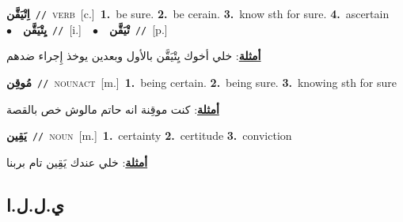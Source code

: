 \documentclass[10pt,a4paper,twoside]{article} %
\begin{document}
\begin{multicols}{2}
{{{{{{\setlength\topsep{0pt}\textbf{\foreignlanguage{arabic}{اِتْيَقَّن}}\ {\color{gray}\texttt{//}\color{black}}\ \textsc{verb}\ [c.]\ \textbf{1.}~be sure.  \textbf{2.}~be cerain.  \textbf{3.}~know sth for sure.  \textbf{4.}~ascertain\ \ $\bullet$\ \ \setlength\topsep{0pt}\textbf{\foreignlanguage{arabic}{يِتْيَقَّن}}\ {\color{gray}\texttt{//}\color{black}}\ [i.]\ \ $\bullet$\ \ \setlength\topsep{0pt}\textbf{\foreignlanguage{arabic}{تْيَقَّن}}\ {\color{gray}\texttt{//}\color{black}}\ [p.]\  \begin{flushright}\color{gray}\foreignlanguage{arabic}{\textbf{\underline{\foreignlanguage{arabic}{أمثلة}}}: خلي أخوك يِتْيَقَّن بالأول وبعدين يوخذ إِجراء ضدهم}\end{flushright}\color{black}} \vspace{2mm}

{\setlength\topsep{0pt}\textbf{\foreignlanguage{arabic}{مُوقِن}}\ {\color{gray}\texttt{//}\color{black}}\ \textsc{noun\textunderscore act}\ [m.]\ \textbf{1.}~being certain.  \textbf{2.}~being sure.  \textbf{3.}~knowing sth for sure\  \begin{flushright}\color{gray}\foreignlanguage{arabic}{\textbf{\underline{\foreignlanguage{arabic}{أمثلة}}}: كنت موقِنة انه حاتم مالوش خص بالقصة}\end{flushright}\color{black}} \vspace{2mm}

{\setlength\topsep{0pt}\textbf{\foreignlanguage{arabic}{يَقِين}}\ {\color{gray}\texttt{//}\color{black}}\ \textsc{noun}\ [m.]\ \textbf{1.}~certainty  \textbf{2.}~certitude  \textbf{3.}~conviction\  \begin{flushright}\color{gray}\foreignlanguage{arabic}{\textbf{\underline{\foreignlanguage{arabic}{أمثلة}}}: خلي عندك يَقِين تام بربنا}\end{flushright}\color{black}} \vspace{2mm}

\vspace{-3mm}
\subsection*{\color{blue}\foreignlanguage{arabic}{ي.ل.ل.ا}\color{blue}{ (ntws)}} 

}}}}}
\end{multicols}
\end{document}
